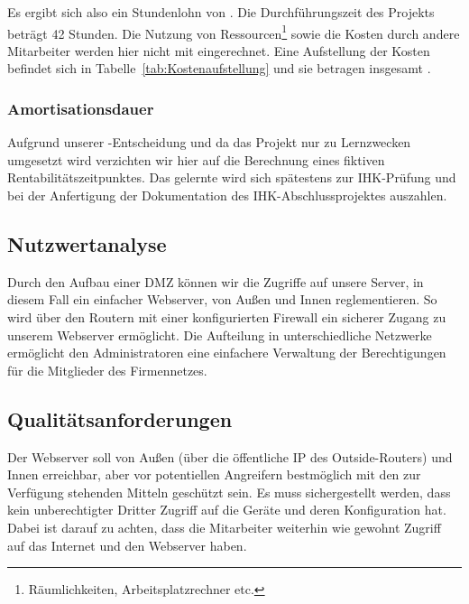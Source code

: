Es ergibt sich also ein Stundenlohn von . 
Die Durchführungszeit des Projekts beträgt 42 Stunden. 
Die Nutzung von Ressourcen\footnote{Räumlichkeiten, Arbeitsplatzrechner etc.} sowie die Kosten durch andere Mitarbeiter werden hier nicht mit eingerechnet. 
Eine Aufstellung der Kosten befindet sich in Tabelle~\ref{tab:Kostenaufstellung} und sie betragen insgesamt .


\subsubsection{Amortisationsdauer}
\label{sec:Amortisationsdauer}

    Aufgrund unserer -Entscheidung und da das Projekt nur zu Lernzwecken umgesetzt wird verzichten wir hier auf die Berechnung eines fiktiven Rentabilitätszeitpunktes. Das gelernte wird sich spätestens zur IHK-Prüfung und bei der Anfertigung der Dokumentation des IHK-Abschlussprojektes auszahlen.

\subsection{Nutzwertanalyse}
\label{sec:Nutzwertanalyse}
Durch den Aufbau einer DMZ können wir die Zugriffe auf unsere Server, in diesem Fall ein einfacher Webserver, von Außen und Innen reglementieren. So wird über den Routern mit einer konfigurierten Firewall ein sicherer Zugang zu unserem Webserver ermöglicht. Die Aufteilung in unterschiedliche Netzwerke ermöglicht den Administratoren eine einfachere Verwaltung der Berechtigungen für die Mitglieder des Firmennetzes.



\subsection{Qualitätsanforderungen}
\label{sec:Qualitaetsanforderungen}
Der Webserver soll von Außen (über die öffentliche IP des Outside-Routers) und Innen erreichbar, aber vor potentiellen Angreifern bestmöglich mit den zur Verfügung stehenden Mitteln geschützt sein. Es muss sichergestellt werden, dass kein unberechtigter Dritter Zugriff auf die Geräte und deren Konfiguration hat. Dabei ist darauf zu achten, dass die Mitarbeiter weiterhin wie gewohnt Zugriff auf das Internet und den Webserver haben.

